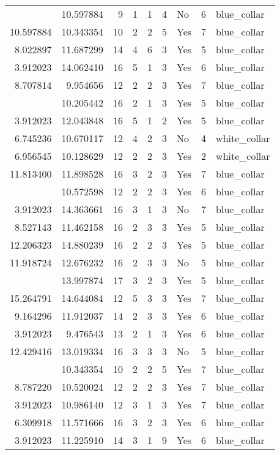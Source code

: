 \documentclass[
]{article}
\begin{document}
\begin{longtable}[t]{rrrrrllrl}
\addlinespace
3.912023 & 10.597884 & 9 & 1 & 1 & 4 & No & 6 & blue\_collar\\
10.597884 & 10.343354 & 10 & 2 & 2 & 5 & Yes & 7 & blue\_collar\\
8.022897 & 11.687299 & 14 & 4 & 6 & 3 & Yes & 5 & blue\_collar\\
3.912023 & 14.062410 & 16 & 5 & 1 & 3 & Yes & 6 & blue\_collar\\
8.707814 & 9.954656 & 12 & 2 & 2 & 3 & Yes & 7 & blue\_collar\\
\addlinespace
3.912023 & 10.205442 & 16 & 2 & 1 & 3 & Yes & 5 & blue\_collar\\
3.912023 & 12.043848 & 16 & 5 & 1 & 2 & Yes & 5 & blue\_collar\\
6.745236 & 10.670117 & 12 & 4 & 2 & 3 & No & 4 & white\_collar\\
6.956545 & 10.128629 & 12 & 2 & 2 & 3 & Yes & 2 & white\_collar\\
11.813400 & 11.898528 & 16 & 3 & 2 & 3 & Yes & 7 & blue\_collar\\
\addlinespace
9.619133 & 10.572598 & 12 & 2 & 2 & 3 & Yes & 6 & blue\_collar\\
3.912023 & 14.363661 & 16 & 3 & 1 & 3 & No & 7 & blue\_collar\\
8.527143 & 11.462158 & 16 & 2 & 3 & 3 & Yes & 5 & blue\_collar\\
12.206323 & 14.880239 & 16 & 2 & 2 & 3 & Yes & 5 & blue\_collar\\
11.918724 & 12.676232 & 16 & 2 & 3 & 3 & No & 5 & blue\_collar\\
\addlinespace
12.196275 & 13.997874 & 17 & 3 & 2 & 3 & Yes & 5 & blue\_collar\\
15.264791 & 14.644084 & 12 & 5 & 3 & 3 & Yes & 7 & blue\_collar\\
9.164296 & 11.912037 & 14 & 2 & 3 & 3 & Yes & 6 & blue\_collar\\
3.912023 & 9.476543 & 13 & 2 & 1 & 3 & Yes & 6 & blue\_collar\\
12.429416 & 13.019334 & 16 & 3 & 3 & 3 & No & 5 & blue\_collar\\
\addlinespace
10.597884 & 10.343354 & 10 & 2 & 2 & 5 & Yes & 7 & blue\_collar\\
8.787220 & 10.520024 & 12 & 2 & 2 & 3 & Yes & 7 & blue\_collar\\
3.912023 & 10.986140 & 12 & 3 & 1 & 3 & Yes & 7 & blue\_collar\\
6.309918 & 11.571666 & 16 & 3 & 2 & 3 & Yes & 6 & blue\_collar\\
3.912023 & 11.225910 & 14 & 3 & 1 & 9 & Yes & 6 & blue\_collar\\

\end{longtable}
\end{document}
